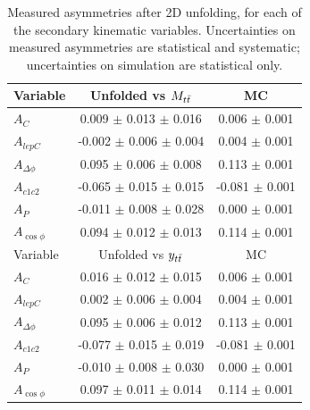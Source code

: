 \begin{table}[hbt]
\begin{center}
\caption{Measured asymmetries after 2D unfolding, for each of the
  secondary kinematic variables. Uncertainties on measured asymmetries
  are statistical and systematic; uncertainties on simulation are
  statistical only.}
\label{tab:afb:results2d:inclusive}
\begin{tabular}{l |  c  c }
\hline
Variable &  Unfolded vs $M_{t\bar{t}}$  &  MC \\ \hline
$A_{C}$                                 & 0.009 $\pm$ 0.013     $\pm$ 0.016      & 0.006 $\pm$  0.001 \\
$A_{lepC}$                              & -0.002 $\pm$ 0.006 $\pm$ 0.004         & 0.004 $\pm$  0.001 \\
$A_{\Delta\phi}$        & 0.095 $\pm$ 0.006     $\pm$ 0.008          & 0.113 $\pm$  0.001 \\
$A_{c1c2}$                              & -0.065 $\pm$ 0.015 $\pm$ 0.015         & -0.081 $\pm$  0.001 \\
$A_{P}$                   & -0.011 $\pm$ 0.008 $\pm$ 0.028         & 0.000 $\pm$  0.001 \\
$A_{\cos\phi}$                              & 0.094 $\pm$ 0.012 $\pm$ 0.013      & 0.114 $\pm$  0.001 \\
 \hline

\hline
Variable &  Unfolded vs $y_{t\bar{t}}$  &  MC \\ \hline
$A_{C}$                                 & 0.016 $\pm$ 0.012     $\pm$ 0.015      & 0.006 $\pm$  0.001 \\
$A_{lepC}$                              & 0.002 $\pm$ 0.006     $\pm$ 0.004          & 0.004 $\pm$  0.001 \\
$A_{\Delta\phi}$        & 0.095 $\pm$ 0.006     $\pm$ 0.012          & 0.113 $\pm$  0.001 \\
$A_{c1c2}$                              & -0.077 $\pm$ 0.015 $\pm$ 0.019         & -0.081 $\pm$  0.001 \\
$A_{P}$                   & -0.010 $\pm$ 0.008 $\pm$ 0.030         & 0.000 $\pm$  0.001 \\
$A_{\cos\phi}$                              & 0.097 $\pm$ 0.011     $\pm$ 0.014      & 0.114 $\pm$  0.001 \\
 \hline


\end{tabular}
\end{center}
\end{table}
